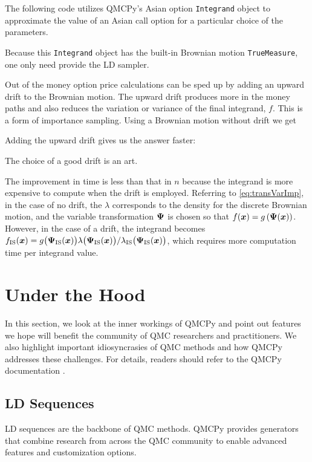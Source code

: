 \documentclass[graybox,footinfo]{svmult}
\newcommand{\IMP}{\textup{IS}}
\begin{document}
The following code utilizes QMCPy's Asian option \texttt{Integrand} object to approximate the value of an Asian call option for a particular choice of the parameters.

Because this \texttt{Integrand} object has the built-in Brownian motion \texttt{TrueMeasure}, one only need provide the LD sampler.

Out of the money option price calculations can be sped up by adding an upward drift to the Brownian motion.  The upward drift produces more in the money paths and also reduces the variation or variance of the final integrand, $f$.  This is a form of importance sampling.  Using a Brownian motion without drift we get

Adding the upward drift gives us the answer faster:

The choice of a good drift is an art.  

The improvement in time is less than that in $n$ because the integrand is more expensive to compute when the drift is employed.  Referring to \eqref{eq:transVarImp}, in the case of no drift, the $\lambda$ corresponds to the density for the discrete Brownian motion, and the variable transformation ${\boldsymbol{\Psi}}$ is chosen so that $f({\boldsymbol{x}}) = g\left({\boldsymbol{\Psi}}({\boldsymbol{x}}) \right)$.  However, in the case of a drift, the integrand becomes  $f_\IMP(\bsx)  = g\bigl(\bsPsi_\IMP(\bsx)\bigr)  \lambda\bigl(\bsPsi_\IMP(\bsx)\bigr)/\lambda_\IMP\bigl(\bsPsi_\IMP(\bsx)\bigr)$, which requires more computation time per integrand value. 

\section{Under the Hood}

In this section, we look at the inner workings of QMCPy and point out features we hope will benefit the community of QMC researchers and practitioners. We also highlight important idiosyncrasies of QMC methods and how QMCPy addresses these challenges. For details, readers should refer to the QMCPy documentation \cite{QMCPyDocs}.

\subsection{LD Sequences}

LD sequences are the backbone of QMC methods. QMCPy provides generators that combine research from across the QMC community to enable advanced features and customization options.
\end{document}
